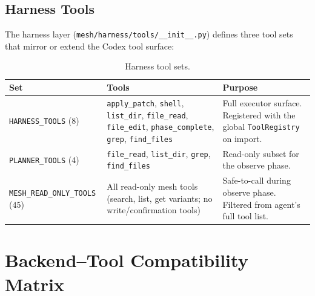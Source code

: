 \documentclass[11pt,letterpaper]{report}
\newcommand{\code}[1]{\texttt{#1}}
\begin{document}
\subsection{Harness Tools}
\label{sec:harness-tools}

The harness layer (\code{mesh/harness/tools/\_\_init\_\_.py}) defines
three tool sets that mirror or extend the Codex tool surface:

\begin{table}[h]
\centering
\small
\begin{tabular}{@{}lL{4cm}L{5.5cm}@{}}
\toprule
\textbf{Set} & \textbf{Tools} & \textbf{Purpose} \\
\midrule
\code{HARNESS\_TOOLS} (8)
  & \code{apply\_patch}, \code{shell}, \code{list\_dir},
    \code{file\_read}, \code{file\_edit},
    \code{phase\_complete}, \code{grep}, \code{find\_files}
  & Full executor surface. Registered with the global
    \code{ToolRegistry} on import. \\
\addlinespace
\code{PLANNER\_TOOLS} (4)
  & \code{file\_read}, \code{list\_dir}, \code{grep},
    \code{find\_files}
  & Read-only subset for the observe phase. \\
\addlinespace
\code{MESH\_READ\_ONLY\_TOOLS} (45)
  & All read-only mesh tools (search, list, get variants;
    no write/confirmation tools)
  & Safe-to-call during observe phase. Filtered from
    agent's full tool list. \\
\bottomrule
\end{tabular}
\caption{Harness tool sets.}
\label{tab:harness-tools}
\end{table}

\section{Backend--Tool Compatibility Matrix}
\label{sec:matrix}
\end{document}
